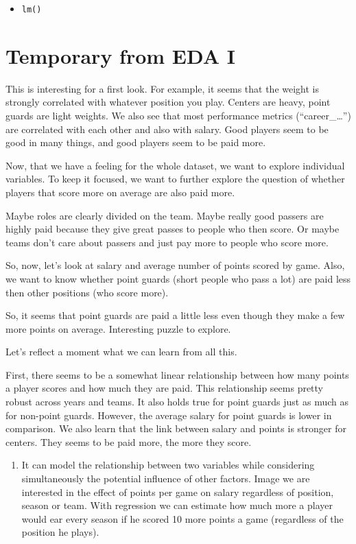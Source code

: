 \documentclass[
]{book}
\providecommand{\tightlist}{%
  \setlength{\itemsep}{0pt}\setlength{\parskip}{0pt}}
\begin{document}
\begin{itemize}
\tightlist
\item
  \texttt{lm()}
\end{itemize}

\hypertarget{temporary-from-eda-i}{%
\section{Temporary from EDA I}\label{temporary-from-eda-i}}

This is interesting for a first look. For example, it seems that the weight is
strongly correlated with whatever position you play. Centers are heavy, point
guards are light weights.
We also see that most performance metrics (``career\_\ldots{}'') are correlated with each
other and also with salary. Good players seem to be good in many things, and
good players seem to be paid more.

Now, that we have a feeling for the whole dataset, we want to explore individual
variables. To keep it focused, we want to further explore the question
of whether players that score more on average are also paid more.

Maybe roles are clearly divided on the team. Maybe really good passers are highly
paid because they give great passes to people who then score. Or maybe teams
don't care about passers and just pay more to people who score more.

So, now, let's look at salary and average number of points scored by game.
Also, we want to know whether point guards (short people who pass a lot) are
paid less then other positions (who score more).

So, it seems that point guards are paid a little less even though they make a few more points on average. Interesting puzzle to explore.

Let's reflect a moment what we can learn from all this.

First, there seems to be a somewhat linear relationship between how many points
a player scores and how much they are paid. This relationship seems pretty robust across years and teams. It also holds true for point guards just as much as for non-point guards. However, the average salary for point guards is lower in comparison. We also learn that the link between salary and points is stronger for centers. They seems to be paid more, the more they score.

\begin{enumerate}
\def\labelenumi{\arabic{enumi})}
\tightlist
\item
  It can model the relationship between two variables while considering simultaneously the potential influence of other factors. Image we are interested
  in the effect of points per game on salary regardless of position, season or team.
  With regression we can estimate how much more a player would ear every season
  if he scored 10 more points a game (regardless of the position he plays).
\end{enumerate}
\end{document}
